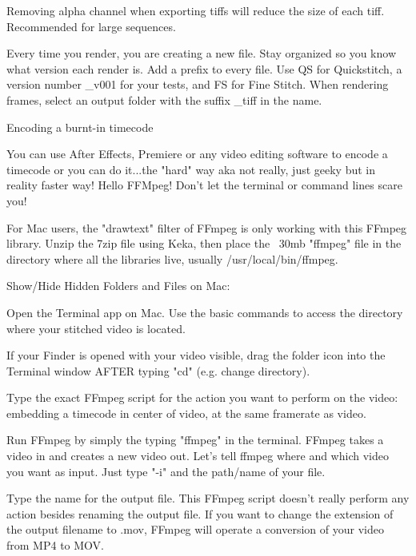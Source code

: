\begin{fullwidth}
\tip Removing alpha channel when exporting tiffs will reduce the size of each tiff. Recommended for large sequences.

Every time you render, you are creating a new file. Stay organized so you know what version each render is. Add a prefix to every file. Use QS for Quickstitch, a version number \_v001 for your tests, and FS for Fine Stitch. When rendering frames, select an output folder with the suffix  \_tiff in the name.

{\large Encoding a burnt-in timecode \par}

You can use After Effects, Premiere or any video editing software to encode a timecode or you can do it...the "hard" way aka not really, just geeky but in reality faster way! Hello FFMpeg! Don't let the terminal or command lines scare you!

For Mac users, the "drawtext" filter of FFmpeg is only working with this FFmpeg library. Unzip the 7zip file using Keka, then place the ~30mb "ffmpeg" file in the directory where all the libraries live, usually /usr/local/bin/ffmpeg.

Show/Hide Hidden Folders and Files on Mac:

 \par
{}

Open the Terminal app on Mac. Use the basic commands to access the directory where your stitched video is located.

\tip If your Finder is opened with your video visible, drag the folder icon into the Terminal window AFTER typing "cd" (e.g. change directory).

Type the exact FFmpeg script for the action you want to perform on the video: embedding a timecode in center of video, at the same framerate as video.


Run FFmpeg by simply the typing "ffmpeg" in the terminal. FFmpeg takes a video in and creates a new video out. Let's tell ffmpeg where and which video you want as input. Just type "-i" and the path/name of your file.


Type the name for the output file. This FFmpeg script doesn't really perform any action besides renaming the output file. If you want to change the extension of the output filename to .mov, FFmpeg will operate a conversion of your video from MP4 to MOV.


\end{fullwidth}
